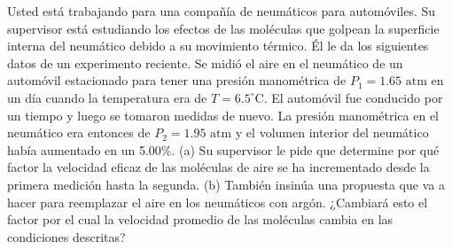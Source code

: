 \item Usted está trabajando para una compañía de neumáticos para automóviles. Su supervisor está estudiando los efectos de las moléculas que golpean la superficie interna del neumático debido a su movimiento térmico. Él le da los siguientes datos de un experimento reciente. Se midió el aire en el neumático de un automóvil estacionado para tener una presión manométrica de $P_1 = 1.65\text{ atm}$ en un día cuando la temperatura era de $T = 6.5^\circ\text{C}$. El automóvil fue conducido por un tiempo y luego se tomaron medidas de nuevo. La presión manométrica en el neumático era entonces de $P_2 = 1.95\text{ atm}$ y el volumen interior del neumático había aumentado en un 5.00\%. (a) Su supervisor le pide que determine por qué factor la velocidad eficaz de las moléculas de aire se ha incrementado desde la primera medición hasta la segunda. (b) También insinúa una propuesta que va a hacer para reemplazar el aire en los neumáticos con argón. ¿Cambiará esto el factor por el cual la velocidad promedio de las moléculas cambia en las condiciones descritas?
